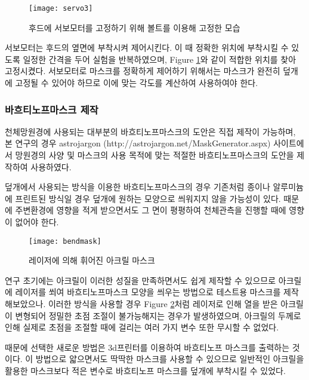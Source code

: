 \begin{figure}[ht]
	\begin{center}
		\texttt{[image: servo3]}
	\end{center}
	\caption{후드에 서보모터를 고정하기 위해 볼트를 이용해 고정한 모습}
	\label{servo}
\end{figure}


서보모터는 후드의 옆면에 부착시켜 제어시킨다. 이 때 정확한 위치에 부착시킬 수 있도록 일정한 간격을 두어 실험을 반복하였으며, \textrm{Figure} \ref{servo}와 같이 적합한 위치를 찾아 고정시켰다. 서보모터로 마스크를 정확하게 제어하기 위해서는 마스크가 완전히 덮개에 고정될 수 있어야 하므로 이에 맞는 각도를 계산하여 사용하여야 한다.

\newpage
\subsubsection{바흐티노프마스크 제작}
천체망원경에 사용되는 대부분의 바흐티노프마스크의 도안은 직접 제작이 가능하며, 본 연구의 경우 astrojargon (http://astrojargon.net/MaskGenerator.aspx) 사이트에서 망원경의 사양 및 마스크의 사용 목적에 맞는 적절한 바흐티노프마스크의 도안을 제작하여 사용하였다.

덮개에서 사용되는 방식을 이용한 바흐티노프마스크의 경우 기존처럼 종이나 알루미늄에 프린트된 방식일 경우 덮개에 원하는 모양으로 씌워지지 않을 가능성이 있다. 때문에 주변환경에 영향을 적게 받으면서도 그 면이 평평하여 천체관측을 진행할 때에 영향이 없어야 한다. 

\begin{figure}[h]
	\begin{center}
		\texttt{[image: bendmask]}
	\end{center}
	\caption{레이저에 의해 휘어진 아크릴 마스크}
	\label{bendmask}
\end{figure}


연구 초기에는 아크릴이 이러한 성질을 만족하면서도 쉽게 제작할 수 있으므로 아크릴에 레이저를 쐬여 바흐티노프마스크 모양을 씌우는 방법으로 테스트용 마스크를 제작해보았으나. 이러한 방식을 사용할 경우 \textrm{Figure} \ref{bendmask}처럼 레이저로 인해 열을 받은 아크릴이 변형되어 정밀한 초점 조절이 불가능해지는 경우가 발생하였으며, 아크릴의 두께로 인해 실제로 초점을 조절할 때에 걸리는 여러 가지 변수 또한 무시할 수 없었다.


때문에 선택한 새로운 방법은 3d프린터를 이용하여 바흐티노프 마스크를 출력하는 것이다. 이 방법으로 얇으면서도 딱딱한 마스크를 사용할 수 있으므로 일반적인 아크릴을 활용한 마스크보다 적은 변수로 바흐티노프 마스크를 덮개에 부착시킬 수 있었다.

